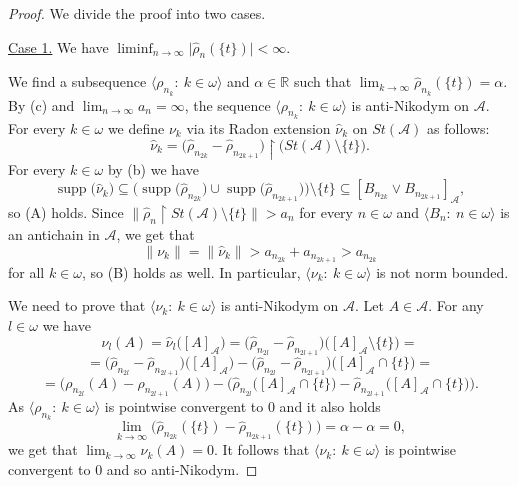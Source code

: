 \documentclass[a4paper,11pt,fleqn]{amsart}
\theoremstyle{definition}
\theoremstyle{remark}
\numberwithin{equation}{section}
\newcommand{\N}{\mathbb{N}}
\newcommand{\R}{\mathbb{R}}
\newcommand{\aA}{\mathcal{A}}
\newcommand{\rstr}{\restriction}
\newcommand{\sm}{\setminus}
\newcommand{\sub}{\subseteq}
\DeclareMathOperator{\supp}{supp}
\newcommand{\wh}{\widehat}
\newcommand{\seqn}[1]{\big\langle#1\colon\ n\io\big\rangle}
\newcommand{\seqk}[1]{\big\langle#1\colon\ k\io\big\rangle}
\newcommand{\clopen}[1]{\left[#1\right]}
\newcommand{\io}{\in\omega}%
\begin{document}
\begin{proof}
We divide the proof into two cases.

\medskip

\underline{Case 1.} We have $\liminf_{n\to\infty} \big| \wh{\rho}_n(\{t\}) \big| < \infty$.

We find a subsequence $\seqk{\rho_{n_k}}$ and $\alpha\in\R$ such that $\lim_{k\to\infty}\wh{\rho}_{n_k}(\{t\})=\alpha$. %
By (c) and $\lim_{n\to\infty}a_n=\infty$, the sequence $\seqk{\rho_{n_k}}$ is anti-Nikodym on $\aA$. For every $k\io$ we define $\nu_k$ via its Radon extension $\wh{\nu}_k$ on $St(\aA)$ as follows:
\[\wh{\nu}_k= \big( \wh{\rho}_{n_{2k}} - \wh{\rho}_{n_{2k+1}} \big) \rstr\big(St(\aA) \sm \{t\}\big).\]
For every $k\io$ by (b) we have
\[ \supp\big(\wh{\nu}_k\big)\sub \big(\supp\big(\wh{\rho}_{n_{2k}}\big)\cup \supp\big(\wh{\rho}_{n_{2k+1}}\big) \big) \sm \{t\} \sub \clopen{B_{n_{2k}}\vee B_{n_{2k+1}}}_\aA,\]
so (A) holds. Since $\big\|\wh{\rho}_n\rstr St(\aA)\sm\{t\}\big\|>a_n$ for every $n\io$ and $\seqn{B_n}$ is an antichain in $\aA$, we get that
\[\big\|\nu_k\big\| = \big\|\wh{\nu}_k\big\| > a_{n_{2k}}+a_{n_{2k+1}} > a_{n_{2k}}\]
for all $k\io$, so (B) holds as well. In particular, $\seqk{\nu_k}$ is not norm bounded.


We need to prove that $\seqk{\nu_k}$ is anti-Nikodym on $\aA$. Let $A\in\aA$. For any $l\io$ we have
\[\nu_l(A)=\wh{\nu}_l \big(\clopen{A}_\aA\big) =
\big( \wh{\rho}_{n_{2l}} - \wh{\rho}_{n_{2l+1}} \big) \big(\clopen{A}_\aA \sm \{t\} \big) =\]
\[= \big( \wh{\rho}_{n_{2l}} - \wh{\rho}_{n_{2l+1}} \big) \big(\clopen{A}_\aA \big) - \big( \wh{\rho}_{n_{2l}} - \wh{\rho}_{n_{2l+1}} \big) \big(\clopen{A}_\aA \cap \{t\} \big)=\]
\[= \big( {\rho}_{n_{2l}} (A) - {\rho}_{n_{2l+1}} (A) \big)-\Big( \wh{\rho}_{n_{2l}}\big(\clopen{A}_\aA \cap \{t\} \big) - \wh{\rho}_{n_{2l+1}}\big(\clopen{A}_\aA \cap \{t\} \big) \Big).\]
As $\seqk{\rho_{n_k}}$ is pointwise convergent to $0$ and it also holds
\[\lim_{k\to\infty}\Big(\wh{\rho}_{n_{2k}} (\{t\} ) - \wh{\rho}_{n_{2k+1}} (\{t\} )\Big)=\alpha-\alpha=0,\]
we get that $\lim_{k\to\infty}\nu_k(A)=0$. It follows that $\seqk{\nu_k}$ is pointwise convergent to $0$ and so anti-Nikodym.


\end{proof}
\end{document}
